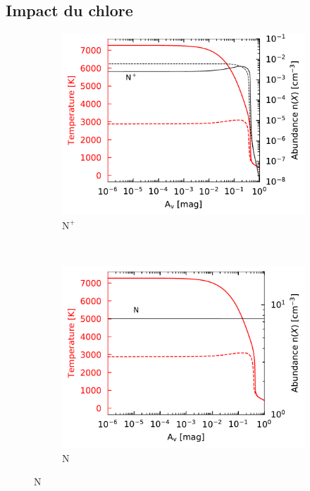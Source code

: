 \begin{appendices}

\section{Impact du chlore} 
\label{appendix:chlore}

\begin{figure}[!htbp]
    \centering
    \begin{subfigure}[t]{0.49\textwidth} %
        \centering \includegraphics[trim = {0 0 0 0},clip,width=1\textwidth]{figure/Cl/gridModelEmiss/nT_comp_Np.pdf}
        \caption{$\mathrm{N}^+$}
    \end{subfigure}
    ~ 
   \begin{subfigure}[t]{0.49\textwidth} %
        \centering \includegraphics[trim = {0 0 0 0},clip,width=1\textwidth]{figure/Cl/gridModelEmiss/nT_comp_N.pdf}
        \caption{$\mathrm{N}$}
    \end{subfigure}
    

\end{figure}
\end{appendices}
